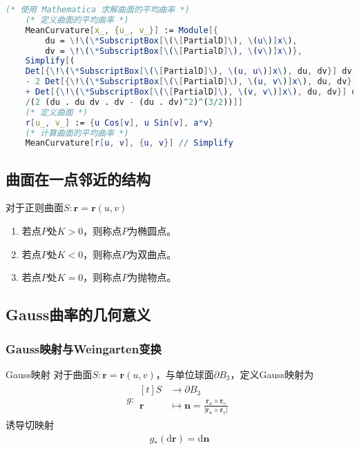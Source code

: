 \documentclass[lang = cn, scheme = chinese, thmcnt = section]{elegantbook}
\newcommand{\bs}{\boldsymbol}          %
\newcommand{\dd}{\mathrm{d}}           %
\begin{document}
\begin{lstlisting}[language = Mathematica]
	(* 使用 Mathematica 求解曲面的平均曲率 *)
	(* 定义曲面的平均曲率 *)
	MeanCurvature[x_, {u_, v_}] := Module[{
		du = \!\(\*SubscriptBox[\(\[PartialD]\), \(u\)]x\), 
		dv = \!\(\*SubscriptBox[\(\[PartialD]\), \(v\)]x\)}, 
	Simplify[(
	Det[{\!\(\*SubscriptBox[\(\[PartialD]\), \(u, u\)]x\), du, dv}] dv . dv 
	- 2 Det[{\!\(\*SubscriptBox[\(\[PartialD]\), \(u, v\)]x\), du, dv}] du . dv 
	+ Det[{\!\(\*SubscriptBox[\(\[PartialD]\), \(v, v\)]x\), du, dv}] du . du)
	/(2 (du . du dv . dv - (du . dv)^2)^(3/2))]]
	(* 定义曲面 *)
	r[u_, v_] := {u Cos[v], u Sin[v], a*v}
	(* 计算曲面的平均曲率 *)
	MeanCurvature[r[u, v], {u, v}] // Simplify
\end{lstlisting}

\subsection{曲面在一点邻近的结构}

对于正则曲面$S:\bs{r}=\bs{r}(u,v)$
\begin{enumerate}
	\item 若点$P$处$K>0$，则称点$P$为椭圆点。
	\item 若点$P$处$K<0$，则称点$P$为双曲点。
	\item 若点$P$处$K=0$，则称点$P$为抛物点。
\end{enumerate}

\subsection{Gauss曲率的几何意义}

\subsubsection{Gauss映射与Weingarten变换}

\begin{definition}{Gauss映射}
	对于曲面$S:\bs{r}=\bs{r}(u,v)$，与单位球面$\partial B_3$，定义Gauss映射为
	\begin{align*}
		g:\begin{aligned}[t]
			S &\longrightarrow \partial B_3\\
			\bs{r} &\longmapsto \bs{n}=\frac{\bs{r}_u\times\bs{r}_v}{|\bs{r}_u\times\bs{r}_v|}
		\end{aligned}
	\end{align*}
	诱导切映射
	\begin{align*}
		g_*(\dd\bs{r})=\dd\bs{n}
	\end{align*}
\end{definition}
\end{document}
